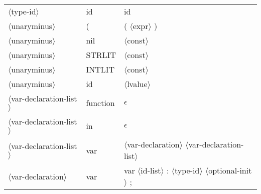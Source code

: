 \documentclass[11pt, fleqn]{article}
\newcommand{\atag}[1]{$\langle$#1$\rangle$}
\begin{document}
\begin{longtable}{l|l|l}
\atag{type-id}					&	id		&	id	\\
\atag{unaryminus}				&	(		&	( \atag{expr} )	\\
\atag{unaryminus}				&	nil		&	\atag{const}	\\
\atag{unaryminus}				&	STRLIT		&	\atag{const}	\\
\atag{unaryminus}				&	INTLIT		&	\atag{const}	\\
\atag{unaryminus}				&	id		&	\atag{lvalue}		\\
\atag{var-declaration-list}		&	function		&	$\epsilon$	\\
\atag{var-declaration-list}		&	in	&		$\epsilon$		\\
\atag{var-declaration-list}		&	var		& 	\atag{var-declaration} \atag{var-declaration-list}		\\
\atag{var-declaration}			&	var 		&	var \atag{id-list} : \atag{type-id} \atag{optional-init} ;	\\
\end{longtable}
\end{document}
